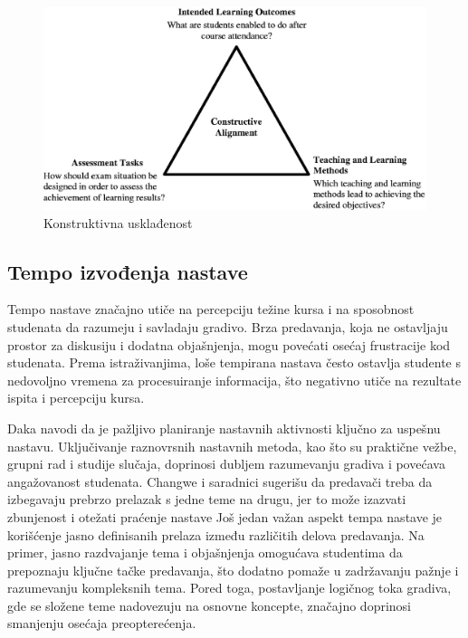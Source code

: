 \documentclass[a4paper]{article}
\begin{document}
\begin{figure}[h!]
\begin{center}
\includegraphics[scale=2]{constructive_alignment.jpeg}
\end{center}
\caption{Konstruktivna usklađenost}
\label{fig:konstruktivna_uskladjenost}
\end{figure}

\subsection{Tempo izvođenja nastave}
Tempo nastave značajno utiče na percepciju težine kursa i na sposobnost studenata da
razumeju i savladaju gradivo. Brza predavanja, koja ne ostavljaju prostor za diskusiju i
dodatna objašnjenja, mogu povećati osećaj frustracije kod studenata. Prema istraživanjima,
loše tempirana nastava često ostavlja studente s nedovoljno vremena za procesuiranje
informacija, što negativno utiče na rezultate ispita i percepciju kursa.

Daka \cite{daka2020exploration} navodi da je pažljivo planiranje nastavnih aktivnosti ključno za uspešnu
nastavu. Uključivanje raznovrsnih nastavnih metoda, kao što su praktične vežbe, grupni rad i
studije slučaja, doprinosi dubljem razumevanju gradiva i povećava angažovanost studenata.
Changwe i saradnici \cite{daka2020exploration} sugerišu da predavači treba da izbegavaju prebrzo prelazak s
jedne teme na drugu, jer to može izazvati zbunjenost i otežati praćenje nastave
Još jedan važan aspekt tempa nastave je korišćenje jasno definisanih prelaza između
različitih delova predavanja. Na primer, jasno razdvajanje tema i objašnjenja omogućava
studentima da prepoznaju ključne tačke predavanja, što dodatno pomaže u zadržavanju
pažnje i razumevanju kompleksnih tema. Pored toga, postavljanje logičnog toka gradiva, gde
se složene teme nadovezuju na osnovne koncepte, značajno doprinosi smanjenju osećaja
preopterećenja.
\end{document}
